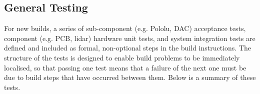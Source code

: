 \documentclass[a4paper]{article}
\begin{document}
	
	\subsection{ General Testing}\label{h.wbekh9ay82yu}
	
	
	
	
	
	
	For new builds, a series of sub-component (e.g. Pololu, DAC) acceptance tests, component (e.g. PCB, lidar) hardware unit tests, and system integration tests are defined and included as formal, non-optional steps in the build instructions.  The structure of the tests is designed to enable build problems to be immediately localised, so that passing one test means that a failure of the next one must be due to build steps that have occurred between them. Below is a summary of these tests.
	
\end{document}
